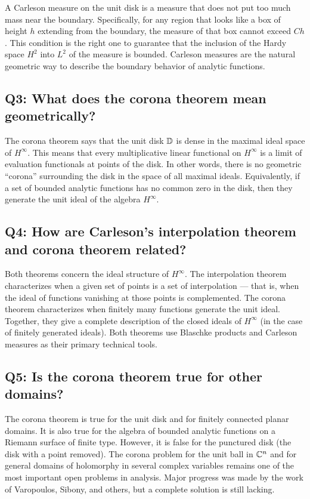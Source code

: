 A Carleson measure on the unit disk is a measure that does not put too much mass near the boundary. Specifically, for any region that looks like a box of height \(h\) extending from the boundary, the measure of that box cannot exceed \(C h\). This condition is the right one to guarantee that the inclusion of the Hardy space \(H^2\) into \(L^2\) of the measure is bounded. Carleson measures are the natural geometric way to describe the boundary behavior of analytic functions.

\subsection*{Q3: What does the corona theorem mean geometrically?}

The corona theorem says that the unit disk \(\mathbb{D}\) is dense in the maximal ideal space of \(H^\infty\). This means that every multiplicative linear functional on \(H^\infty\) is a limit of evaluation functionals at points of the disk. In other words, there is no geometric ``corona'' surrounding the disk in the space of all maximal ideals. Equivalently, if a set of bounded analytic functions has no common zero in the disk, then they generate the unit ideal of the algebra \(H^\infty\).

\subsection*{Q4: How are Carleson's interpolation theorem and corona theorem related?}

Both theorems concern the ideal structure of \(H^\infty\). The interpolation theorem characterizes when a given set of points is a set of interpolation --- that is, when the ideal of functions vanishing at those points is complemented. The corona theorem characterizes when finitely many functions generate the unit ideal. Together, they give a complete description of the closed ideals of \(H^\infty\) (in the case of finitely generated ideals). Both theorems use Blaschke products and Carleson measures as their primary technical tools.

\subsection*{Q5: Is the corona theorem true for other domains?}

The corona theorem is true for the unit disk and for finitely connected planar domains. It is also true for the algebra of bounded analytic functions on a Riemann surface of finite type. However, it is false for the punctured disk (the disk with a point removed). The corona problem for the unit ball in \(\mathbb{C}^n\) and for general domains of holomorphy in several complex variables remains one of the most important open problems in analysis. Major progress was made by the work of Varopoulos, Sibony, and others, but a complete solution is still lacking.

